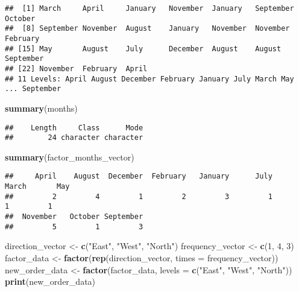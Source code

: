 \documentclass[
]{article}
\newenvironment{Shaded}{\begin{snugshade}}{\end{snugshade}}
\newcommand{\AttributeTok}[1]{\textcolor[rgb]{0.13,0.29,0.53}{#1}}
\newcommand{\DecValTok}[1]{\textcolor[rgb]{0.00,0.00,0.81}{#1}}
\newcommand{\FunctionTok}[1]{\textcolor[rgb]{0.13,0.29,0.53}{\textbf{#1}}}
\newcommand{\NormalTok}[1]{#1}
\newcommand{\OtherTok}[1]{\textcolor[rgb]{0.56,0.35,0.01}{#1}}
\newcommand{\StringTok}[1]{\textcolor[rgb]{0.31,0.60,0.02}{#1}}
\begin{document}
\begin{verbatim}
##  [1] March     April     January   November  January   September October  
##  [8] September November  August    January   November  November  February 
## [15] May       August    July      December  August    August    September
## [22] November  February  April    
## 11 Levels: April August December February January July March May ... September
\end{verbatim}

\begin{Shaded}
\begin{Highlighting}[]
\FunctionTok{summary}\NormalTok{(months)}
\end{Highlighting}
\end{Shaded}

\begin{verbatim}
##    Length     Class      Mode 
##        24 character character
\end{verbatim}

\begin{Shaded}
\begin{Highlighting}[]
\FunctionTok{summary}\NormalTok{(factor\_months\_vector)}
\end{Highlighting}
\end{Shaded}

\begin{verbatim}
##     April    August  December  February   January      July     March       May 
##         2         4         1         2         3         1         1         1 
##  November   October September 
##         5         1         3
\end{verbatim}

\begin{Shaded}
\begin{Highlighting}[]
\NormalTok{direction\_vector }\OtherTok{\textless{}{-}} \FunctionTok{c}\NormalTok{(}\StringTok{"East"}\NormalTok{, }\StringTok{"West"}\NormalTok{, }\StringTok{"North"}\NormalTok{)}
\NormalTok{frequency\_vector }\OtherTok{\textless{}{-}} \FunctionTok{c}\NormalTok{(}\DecValTok{1}\NormalTok{, }\DecValTok{4}\NormalTok{, }\DecValTok{3}\NormalTok{)}
\NormalTok{factor\_data }\OtherTok{\textless{}{-}} \FunctionTok{factor}\NormalTok{(}\FunctionTok{rep}\NormalTok{(direction\_vector, }\AttributeTok{times =}\NormalTok{ frequency\_vector))}
\NormalTok{new\_order\_data }\OtherTok{\textless{}{-}} \FunctionTok{factor}\NormalTok{(factor\_data, }\AttributeTok{levels =} \FunctionTok{c}\NormalTok{(}\StringTok{"East"}\NormalTok{, }\StringTok{"West"}\NormalTok{, }\StringTok{"North"}\NormalTok{))}
\FunctionTok{print}\NormalTok{(new\_order\_data)}
\end{Highlighting}
\end{Shaded}
\end{document}
